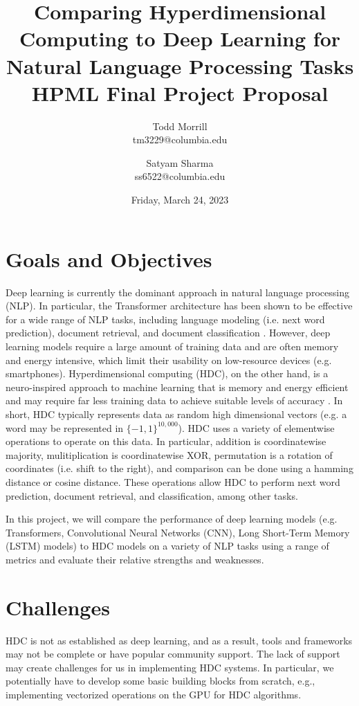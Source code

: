 \documentclass[12pt]{article}
\title{Comparing Hyperdimensional Computing to Deep Learning for Natural Language Processing Tasks\\
\large HPML Final Project Proposal}
\author{Todd Morrill \\ tm3229@columbia.edu \and Satyam Sharma \\ ss6522@columbia.edu}
\date{Friday, March 24, 2023}
\begin{document}
\maketitle

\section{Goals and Objectives}
Deep learning is currently the dominant approach in natural language processing (NLP). In particular, the Transformer \cite{Transformer} architecture has been shown to be effective for a wide range of NLP tasks, including language modeling (i.e. next word prediction), document retrieval, and document classification \cite{SuperGLUE}. However, deep learning models require a large amount of training data and are often memory and energy intensive, which limit their usability on low-resource devices (e.g. smartphones). Hyperdimensional computing (HDC), on the other hand, is a neuro-inspired approach to machine learning that is memory and energy efficient and may require far less training data to achieve suitable levels of accuracy \cite{HDC}. In short, HDC typically represents data as random high dimensional vectors (e.g. a word may be represented in $\{-1, 1\}^{10,000}$). HDC uses a variety of elementwise operations to operate on this data. In particular, addition is coordinatewise majority, mulitiplication is coordinatewise XOR, permutation is a rotation of coordinates (i.e. shift to the right), and comparison can be done using a hamming distance or cosine distance. These operations allow HDC to perform next word prediction, document retrieval, and classification, among other tasks.

In this project, we will compare the performance of deep learning models (e.g. Transformers, Convolutional Neural Networks (CNN), Long Short-Term Memory (LSTM) models) to HDC models on a variety of NLP tasks using a range of metrics and evaluate their relative strengths and weaknesses.

\section{Challenges}
HDC is not as established as deep learning, and as a result, tools and frameworks may not be complete or have popular community support. The lack of support may create challenges for us in implementing HDC systems. In particular, we potentially have to develop some basic building blocks from scratch, e.g., implementing vectorized operations on the GPU for HDC algorithms.
\end{document}

